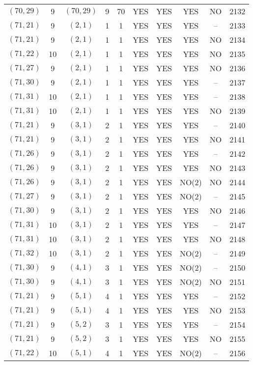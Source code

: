 \begin{longtable}{|c|c|c|c|c|c|c|c|c|c|}
$(70, 29)$ & 9 & $(70, 29)$ & 9 & 70 & YES & YES & YES & NO & 2132\\
$(71, 21)$ & 9 & $(2, 1)$ & 1 & 1 & YES & YES & YES & -- & 2133\\
$(71, 21)$ & 9 & $(2, 1)$ & 1 & 1 & YES & YES & YES & NO & 2134\\
$(71, 22)$ & 10 & $(2, 1)$ & 1 & 1 & YES & YES & YES & NO & 2135\\
$(71, 27)$ & 9 & $(2, 1)$ & 1 & 1 & YES & YES & YES & NO & 2136\\
$(71, 30)$ & 9 & $(2, 1)$ & 1 & 1 & YES & YES & YES & -- & 2137\\
$(71, 31)$ & 10 & $(2, 1)$ & 1 & 1 & YES & YES & YES & -- & 2138\\
$(71, 31)$ & 10 & $(2, 1)$ & 1 & 1 & YES & YES & YES & NO & 2139\\
$(71, 21)$ & 9 & $(3, 1)$ & 2 & 1 & YES & YES & YES & -- & 2140\\
$(71, 21)$ & 9 & $(3, 1)$ & 2 & 1 & YES & YES & YES & NO & 2141\\
$(71, 26)$ & 9 & $(3, 1)$ & 2 & 1 & YES & YES & YES & -- & 2142\\
$(71, 26)$ & 9 & $(3, 1)$ & 2 & 1 & YES & YES & YES & NO & 2143\\
$(71, 26)$ & 9 & $(3, 1)$ & 2 & 1 & YES & YES & NO(2) & NO & 2144\\
$(71, 27)$ & 9 & $(3, 1)$ & 2 & 1 & YES & YES & NO(2) & -- & 2145\\
$(71, 30)$ & 9 & $(3, 1)$ & 2 & 1 & YES & YES & YES & NO & 2146\\
$(71, 31)$ & 10 & $(3, 1)$ & 2 & 1 & YES & YES & YES & -- & 2147\\
$(71, 31)$ & 10 & $(3, 1)$ & 2 & 1 & YES & YES & YES & NO & 2148\\
$(71, 32)$ & 10 & $(3, 1)$ & 2 & 1 & YES & YES & NO(2) & -- & 2149\\
$(71, 30)$ & 9 & $(4, 1)$ & 3 & 1 & YES & YES & NO(2) & -- & 2150\\
$(71, 30)$ & 9 & $(4, 1)$ & 3 & 1 & YES & YES & NO(2) & NO & 2151\\
$(71, 21)$ & 9 & $(5, 1)$ & 4 & 1 & YES & YES & YES & -- & 2152\\
$(71, 21)$ & 9 & $(5, 1)$ & 4 & 1 & YES & YES & YES & NO & 2153\\
$(71, 21)$ & 9 & $(5, 2)$ & 3 & 1 & YES & YES & YES & -- & 2154\\
$(71, 21)$ & 9 & $(5, 2)$ & 3 & 1 & YES & YES & YES & NO & 2155\\
$(71, 22)$ & 10 & $(5, 1)$ & 4 & 1 & YES & YES & NO(2) & -- & 2156\\

\end{longtable}
